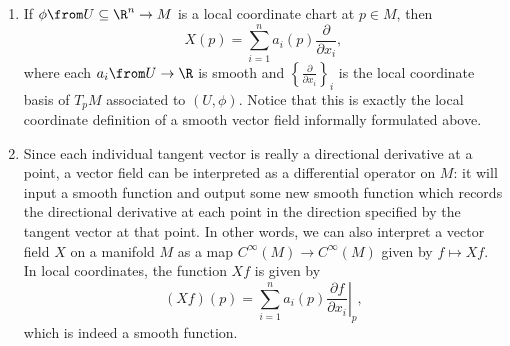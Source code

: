 \begin{remark}
	\begin{enumerate}
		\item If $\phi \from U \subseteq \R^n \to M$ is a local coordinate chart at $p \in M$, then 
		\[
			X(p) = \sum_{i=1}^n a_i(p) \frac{\partial }{\partial x_i},
		\]
		where each $a_i \from U \to \R$ is smooth and $\left\{\frac{\partial}{\partial x_i}\right\}_i$ is the local coordinate basis of $T_pM$ associated to $(U,\phi)$. Notice that this is exactly the local coordinate definition of a smooth vector field informally formulated above.
		
		\item Since each individual tangent vector is really a directional derivative at a point, a vector field can be interpreted as a differential operator on $M$: it will input a smooth function and output some new smooth function which records the directional derivative at each point in the direction specified by the tangent vector at that point. In other words, we can also interpret a vector field $X$ on a manifold $M$ as a map $C^\infty(M) \to C^\infty(M)$ given by $f \mapsto Xf$. In local coordinates, the function $Xf$ is given by
		\[
			(Xf)(p) = \sum_{i=1}^n a_i(p) \left.\frac{\partial f}{\partial x_i}\right|_p,
		\]
		which is indeed a smooth function.
	\end{enumerate}
\end{remark}

